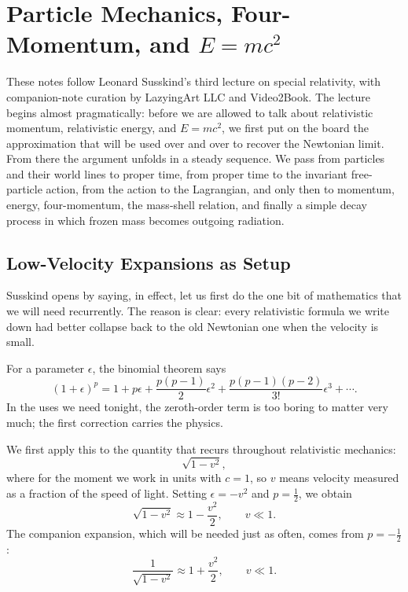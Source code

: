 \chapter{Particle Mechanics, Four-Momentum, and \(E=mc^2\)}

These notes follow Leonard Susskind's third lecture on special relativity, with companion-note curation by LazyingArt LLC and Video2Book. The lecture begins almost pragmatically: before we are allowed to talk about relativistic momentum, relativistic energy, and \(E=mc^2\), we first put on the board the approximation that will be used over and over to recover the Newtonian limit. From there the argument unfolds in a steady sequence. We pass from particles and their world lines to proper time, from proper time to the invariant free-particle action, from the action to the Lagrangian, and only then to momentum, energy, four-momentum, the mass-shell relation, and finally a simple decay process in which frozen mass becomes outgoing radiation.

\section{Low-Velocity Expansions as Setup}

Susskind opens by saying, in effect, let us first do the one bit of mathematics that we will need recurrently. The reason is clear: every relativistic formula we write down had better collapse back to the old Newtonian one when the velocity is small.

For a parameter \(\epsilon\), the binomial theorem says
\begin{equation}
(1+\epsilon)^p
=
1+p\epsilon+\frac{p(p-1)}{2}\epsilon^2+\frac{p(p-1)(p-2)}{3!}\epsilon^3+\cdots.
\end{equation}
In the uses we need tonight, the zeroth-order term is too boring to matter very much; the first correction carries the physics.

We first apply this to the quantity that recurs throughout relativistic mechanics:
\begin{equation}
\sqrt{1-v^2},
\end{equation}
where for the moment we work in units with \(c=1\), so \(v\) means velocity measured as a fraction of the speed of light. Setting \(\epsilon=-v^2\) and \(p=\tfrac12\), we obtain
\begin{equation}
\sqrt{1-v^2}\approx 1-\frac{v^2}{2},
\qquad v\ll 1.
\end{equation}
The companion expansion, which will be needed just as often, comes from \(p=-\tfrac12\):
\begin{equation}
\frac{1}{\sqrt{1-v^2}}
\approx
1+\frac{v^2}{2},
\qquad v\ll 1.
\end{equation}

